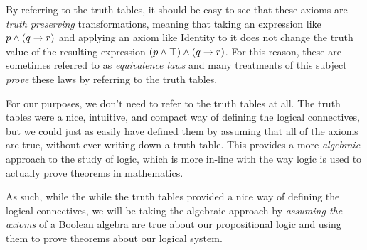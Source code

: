 \begin{definition}
    By referring to the truth tables, it should be easy to see that these axioms are \emph{truth preserving} transformations,
    meaning that taking an expression like $p \wedge (q \rightarrow r)$ and applying an axiom like Identity to it
    does not change the truth value of the resulting expression $(p \wedge \top) \wedge (q \rightarrow r)$.
    For this reason, these are sometimes referred to as \emph{equivalence laws} and many treatments of this subject
    \emph{prove} these laws by referring to the truth tables.

    For our purposes, we don't need to refer to the truth tables at all.
    The truth tables were a nice, intuitive, and compact way of defining the logical connectives,
    but we could just as easily have defined them by assuming that all of the axioms are true,
    without ever writing down a truth table.
    This provides a more \emph{algebraic} approach to the study of logic,
    which is more in-line with the way logic is used to actually prove theorems in mathematics.

    As such, while the while the truth tables provided a nice way of defining the logical connectives,
    we will be taking the algebraic approach by \emph{assuming the axioms} of a Boolean algebra
    are true about our propositional logic
    and using them to prove theorems about our logical system.
\end{definition}

